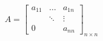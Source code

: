 \documentclass[nofonts]{ctexart}
\begin{document}
\[
	A =
	\begin{bmatrix}
		a_{11}	& \dots	& a_{1n}	\\
			& \ddots& \vdots	\\
		0	&	& a_{nn}
	\end{bmatrix}
	_{n \times n}
\]
\end{document}
